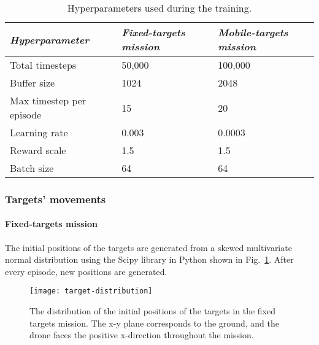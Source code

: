 \documentclass[../main.tex]{subfiles}
\begin{document}
\begin{table}[H]
    \centering
    \caption{Hyperparameters used during the training.}
    \label{tab:hyperparameters}
    \begin{tabularx}{0.8\textwidth}{ X l l }
        \toprule
        \textit{Hyperparameter} 
            & \textit{Fixed-targets mission} 
                & \textit{Mobile-targets mission} \\

        \midrule
        
        Total timesteps
            & 50,000 
                & 100,000 
                \\
        Buffer size 
            & 1024 
                & 2048 
                \\
        
                \raggedright Max timestep per \newline 
                \hphantom{M} episode
            & 15
                & 20
                \\

        Learning rate
            & 0.003
                & 0.0003
                \\
        
        Reward scale
            & 1.5 
                & 1.5 
                \\

        Batch size
            & 64
                & 64
                \\

        \bottomrule		
    \end{tabularx}
\end{table}

\subsubsection{Targets' movements}

\paragraph{Fixed-targets mission}

The initial positions of the targets are generated from a skewed
multivariate normal distribution using the Scipy library in Python
shown in Fig.~\ref{fig:position-distribution}.
After every episode, new positions are generated.

\begin{figure}[!t]
	\centering
	\texttt{[image: target-distribution]}
	\caption{The distribution of the initial positions of the
            targets in the fixed targets mission. The x-y plane
            corresponds to the ground, and the drone faces the positive
            x-direction throughout the mission.}
	\label{fig:position-distribution}
\end{figure}
\end{document}
